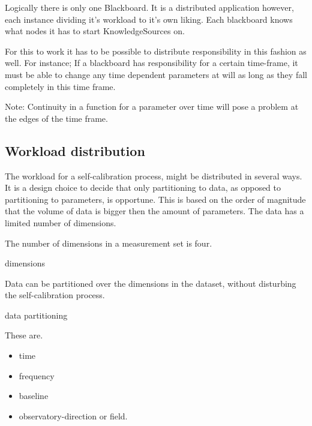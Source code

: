\documentclass[]{lofar}
\begin{document}
      Logically there is only one Blackboard. It is a distributed
      application however, each instance dividing it's workload to
      it's own liking. Each blackboard knows what nodes it has to
      start KnowledgeSources on.

      For this to work it has to be possible to distribute
      responsibility in this fashion as well. For instance; If a
      blackboard has responsibility for a certain time-frame, it must
      be able to change any time dependent parameters at will as long
      as they fall completely in this time frame.
      \begin{em}\large{Note: }Continuity in a function for a parameter
      over time will pose a problem at the edges of the time
      frame.\end{em}

    \subsection{Workload distribution}
    \label{subsec:workload-distribution}\hypertarget{subsec:workload-distribution}{}%

      The workload for a self-calibration process, might be
      distributed in several ways. It is a design choice to decide
      that only partitioning to data, as opposed to partitioning to
      parameters, is opportune. This is based on the order of
      magnitude that the volume of data is bigger then the amount of
      parameters. The data has a limited number of dimensions.

      \begin{assumption}
        The number of dimensions in a measurement set is four.
        \caption{dimensions\label{ass:dimensions}}
      \end{assumption}

      \begin{assumption}
        Data can be partitioned over the dimensions in the dataset,
        without disturbing the self-calibration process.
        \caption{data partitioning\label{ass:partitioning}}
      \end{assumption}

      These are.

      \begin{itemize}

        \item 

          time

	\item 

          frequency

	\item 

          baseline

	\item 

          observatory-direction or field.

      \end{itemize}
\end{document}
